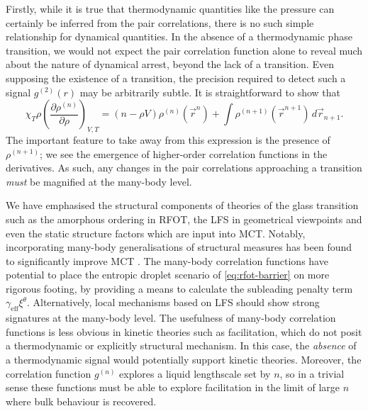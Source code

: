 \documentclass[11pt,twoside]{report}
\begin{document}
Firstly, while it is true that thermodynamic quantities like the pressure can certainly be inferred from the pair correlations, there is no such simple relationship for dynamical quantities.
In the absence of a thermodynamic phase transition, we would not expect the pair correlation function alone to reveal much about the nature of dynamical arrest, beyond the lack of a transition.
Even supposing the existence of a transition, the precision required to detect such a signal $g^{(2)}(r)$ may be arbitrarily subtle.
It is straightforward to show that \cite{Santos2016}
\begin{equation}\label{eq:correlation-derivatives}
  \chi_T \rho
  \left( \frac{\partial \rho^{(n)}}{\partial \rho} \right)_{V,T}
  =
  (n - \rho V) \rho^{(n)}(\vec{r}^n)
  + \int \rho^{(n+1)}(\vec{r}^{n+1}) \, d\vec{r}_{n+1}.
\end{equation}
The important feature to take away from this expression is the presence of $\rho^{(n+1)}$; we see the emergence of higher-order correlation functions in the derivatives.
As such, any changes in the pair correlations approaching a transition \emph{must} be magnified at the many-body level.

We have emphasised the structural components of theories of the glass transition such as the amorphous ordering in RFOT, the LFS in geometrical viewpoints and even the static structure factors which are input into MCT.
Notably, incorporating many-body generalisations of structural measures has been found to significantly improve MCT \cite{JanssenPRL2015,JanssenFP2018}.
The many-body correlation functions have potential to place the entropic droplet scenario of \eqref{eq:rfot-barrier} on more rigorous footing, by providing a means to calculate the subleading penalty term $\gamma_\mathrm{eff} \xi^\theta$.
Alternatively, local mechanisms based on LFS should show strong signatures at the many-body level.
The usefulness of many-body correlation functions is less obvious in kinetic theories such as facilitation, which do not posit a thermodynamic or explicitly structural mechanism.
In this case, the \emph{absence} of a thermodynamic signal would potentially support kinetic theories.
Moreover, the correlation function $g^{(n)}$ explores a liquid lengthscale set by $n$, so in a trivial sense these functions must be able to explore facilitation in the limit of large $n$ where bulk behaviour is recovered.
\end{document}
